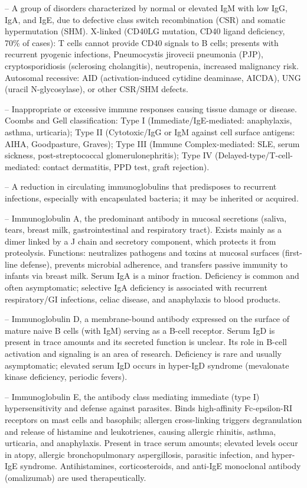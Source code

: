 -- A group of disorders characterized by normal or elevated IgM with low IgG, IgA, and IgE, due to defective class switch recombination (CSR) and somatic hypermutation (SHM). X-linked (CD40LG mutation, CD40 ligand deficiency, 70\% of cases): T cells cannot provide CD40 signals to B cells; presents with recurrent pyogenic infections, Pneumocystis jirovecii pneumonia (PJP), cryptosporidiosis (sclerosing cholangitis), neutropenia, increased malignancy risk. Autosomal recessive: AID (activation-induced cytidine deaminase, AICDA), UNG (uracil N-glycosylase), or other CSR/SHM defects.

-- Inappropriate or excessive immune responses causing tissue damage or disease. Coombs and Gell classification: Type I (Immediate/IgE-mediated: anaphylaxis, asthma, urticaria); Type II (Cytotoxic/IgG or IgM against cell surface antigens: AIHA, Goodpasture, Graves); Type III (Immune Complex-mediated: SLE, serum sickness, post-streptococcal glomerulonephritis); Type IV (Delayed-type/T-cell-mediated: contact dermatitis, PPD test, graft rejection).

-- A reduction in circulating immunoglobulins that predisposes to recurrent infections, especially with encapsulated bacteria; it may be inherited or acquired.

-- Immunoglobulin A, the predominant antibody in mucosal secretions (saliva, tears, breast milk, gastrointestinal and respiratory tract). Exists mainly as a dimer linked by a J chain and secretory component, which protects it from proteolysis. Functions: neutralizes pathogens and toxins at mucosal surfaces (first-line defense), prevents microbial adherence, and transfers passive immunity to infants via breast milk. Serum IgA is a minor fraction. Deficiency is common and often asymptomatic; selective IgA deficiency is associated with recurrent respiratory/GI infections, celiac disease, and anaphylaxis to blood products.

-- Immunoglobulin D, a membrane-bound antibody expressed on the surface of mature naive B cells (with IgM) serving as a B-cell receptor. Serum IgD is present in trace amounts and its secreted function is unclear. Its role in B-cell activation and signaling is an area of research. Deficiency is rare and usually asymptomatic; elevated serum IgD occurs in hyper-IgD syndrome (mevalonate kinase deficiency, periodic fevers).

-- Immunoglobulin E, the antibody class mediating immediate (type I) hypersensitivity and defense against parasites. Binds high-affinity Fc-epsilon-RI receptors on mast cells and basophils; allergen cross-linking triggers degranulation and release of histamine and leukotrienes, causing allergic rhinitis, asthma, urticaria, and anaphylaxis. Present in trace serum amounts; elevated levels occur in atopy, allergic bronchopulmonary aspergillosis, parasitic infection, and hyper-IgE syndrome. Antihistamines, corticosteroids, and anti-IgE monoclonal antibody (omalizumab) are used therapeutically.

